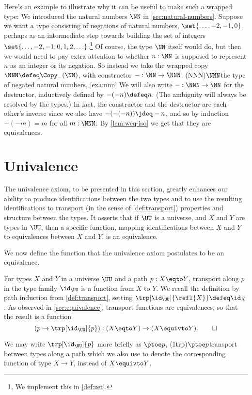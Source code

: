 \begin{example}\label{exa:nnn}
Here's an example to illustrate why it can be useful to make such a wrapped type:
We introduced the natural numbers $\NN$ in \cref{sec:natural-numbers}.
Suppose we want a type consisting of negations of natural numbers,
$\set{\ldots, -2, -1,0}$,
perhaps as an intermediate step towards building the set of integers
$\set{\ldots, -2, -1,0,1,2,\ldots}$.\footnote{%
  We implement this in \cref{def:zet}.}
Of course, the type $\NN$ itself would do,
but then we would need to pay extra attention to whether $n:\NN$
is supposed to represent $n$ as an integer or its negation.
So instead we take the wrapped copy $\NNN\defeq\Copy_{-}(\NN)$,
with constructor ${-} : \NN \to \NNN$.%
\glossary(NNN){$\protect\NNN$}{the type of negated natural numbers,
  \cref{exa:nnn}}
We will also write ${-} : \NNN \to \NN$ for the destructor,
inductively defined by $-(-n)\defeq n$. (The ambiguity will
always be resolved by the types.) In fact, the constructor
and the destructor are each other's inverse since we
also have $-(-(-n))\jdeq -n$, and so by induction $-(-m) = m$ for all $m:\NNN$.
By \cref{lem:weq-iso} we get that they are equivalences.
\end{example}

\section{Univalence}\label{sec:univax}

The univalence axiom, to be presented in this section, greatly enhances 
our ability to produce identifications between the two types and to use the
resulting identifications to transport (in the sense of \cref{def:transport})
properties and structure between the types.  It asserts that if $\UU$
is a universe, and $X$ and $Y$ are types in $\UU$, then a specific function,
mapping identifications between $X$ and $Y$ to equivalences between
$X$ and $Y$, is an equivalence.

We now define the function that the univalence axiom postulates 
to be an equivalence.

\begin{definition}\label{def:idtoeq}
  For types $X$ and $Y$ in a universe $\UU$ and a path $p : X \eqto Y$,
  transport along $p$ in the type family $\id_\UU$ is a function
  from $X$ to $Y$. We recall the definition by path induction
  from \cref{def:transport}, setting $\trp[\id_\UU]{\refl{X}}\defeq\id_X$.
  As observed in \cref{sec:equivalence}, transport functions are
  equivalences, so that the result is a function
  \[
    (p\mapsto \trp[\id_\UU]{p}) : (X \eqto Y) \to (X\equivto Y).
    \qedhere
  \]
\end{definition}
We may write $\trp[\id_\UU]{p}$ more briefly as $\ptoe p$,%
\glossary(1trp){$\protect\ptoe p$}{transport between types along a path}
which we also use to denote the corresponding function of type $X\to Y$,
instead of $X\equivto Y$.


